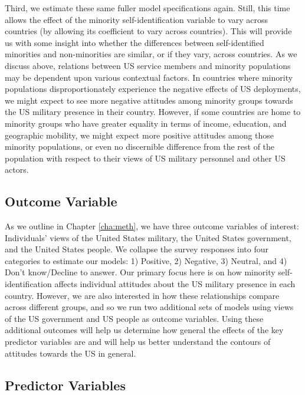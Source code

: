 Third, we estimate these same fuller model specifications again. Still, this time allows the effect of the minority self-identification variable to vary across countries (by allowing its coefficient to vary across countries). This will provide us with some insight into whether the differences between self-identified minorities and non-minorities are similar, or if they vary, across countries. As we discuss above, relations between US service members and minority populations may be dependent upon various contextual factors. In countries where minority populations disproportionately experience the negative effects of US deployments, we might expect to see more negative attitudes among minority groups towards the US military presence in their country. However, if some countries are home to minority groups who have greater equality in terms of income, education, and geographic mobility, we might expect more positive attitudes among those minority populations, or even no discernible difference from the rest of the population with respect to their views of US military personnel and other US actors. 

\subsection*{Outcome Variable}

As we outline in Chapter \ref{cha:meth}, we have three outcome variables of interest: Individuals' views of the United States military, the United States government, and the United States people. We collapse the survey responses into four categories to estimate our models: 1) Positive, 2) Negative, 3) Neutral, and 4) Don't know/Decline to answer. Our primary focus here is on how minority self-identification affects individual attitudes about the US military presence in each country. However, we are also interested in how these relationships compare across different groups, and so we run two additional sets of models using views of the US government and US people as outcome variables. Using these additional outcomes will help us determine how general the effects of the key predictor variables are and will help us better understand the contours of attitudes towards the US in general. 

\subsection*{Predictor Variables}

